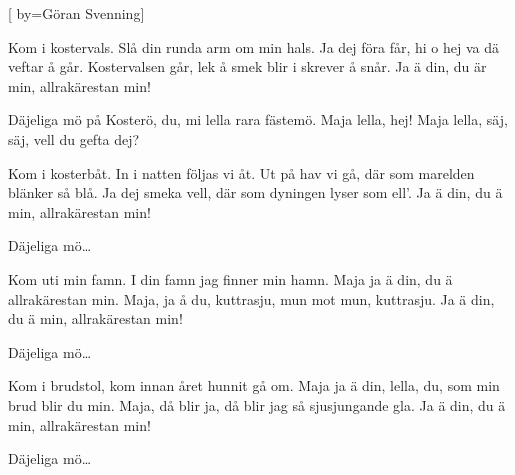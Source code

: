 


[ 	%
	by={Göran Svenning}]		%
	
\beginverse*		%
Kom i kostervals.
Slå din runda arm om min hals.
Ja dej föra får,
hi o hej va dä veftar å går.
Kostervalsen går,
lek å smek blir i skrever å snår.
Ja ä din,
du är min,
allrakärestan min!
\endverse			%

\beginchorus
Däjeliga mö på Kosterö,
du, mi lella rara fästemö.
Maja lella, hej!
Maja lella, säj,
säj, vell du gefta dej?
\endchorus

\beginverse*		%
Kom i kosterbåt.
In i natten följas vi åt.
Ut på hav vi gå,
där som marelden blänker så blå.
Ja dej smeka vell,
där som dyningen lyser som ell’.
Ja ä din, 
du ä min, 
allrakärestan min!
\endverse			%

\beginchorus
Däjeliga mö…
\endchorus

\beginverse*		%
Kom uti min famn.
I din famn jag finner min hamn.
Maja ja ä din,
du ä allrakärestan min.
Maja, ja å du,
kuttrasju, mun mot mun, kuttrasju.
Ja ä din,
du ä min,
allrakärestan min!
\endverse			%

\beginchorus
Däjeliga mö…
\endchorus

\beginverse*		%
Kom i brudstol, kom
innan året hunnit gå om.
Maja ja ä din,
lella, du, som min brud blir du min.
Maja, då blir ja,
då blir jag så sjusjungande gla.
Ja ä din,
du ä min,
allrakärestan min!
\endverse			%

\beginchorus
Däjeliga mö…
\endchorus
\endsong			%

